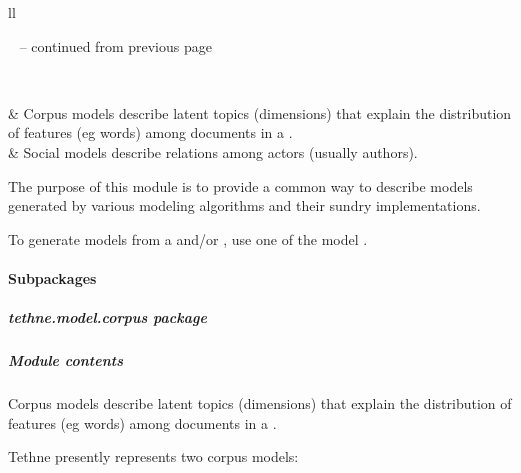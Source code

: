 \documentclass[letterpaper,10pt,english]{sphinxmanual}
\begin{document}
\begin{longtable}{ll}
\hline
\endfirsthead

%
{{\textsf{\tablename\ \thetable{} -- continued from previous page}}} \\
\hline
\endhead

\hline {} \\ \hline
\endfoot

\endlastfoot


{\hyperref[tethne.model.corpus:module-tethne.model.corpus]{}}
 & 
Corpus models describe latent topics (dimensions) that explain the distribution of features (eg words) among documents in a {\hyperref[tethne.classes.corpus:tethne.classes.corpus.Corpus]{}}.
\\

{\hyperref[tethne.model.social:module-tethne.model.social]{}}
 & 
Social models describe relations among actors (usually authors).
\\
\hline\end{longtable}


The purpose of this module is to provide a common way to describe models
generated by various modeling algorithms and their sundry implementations.

To generate models from a {\hyperref[tethne.classes.corpus:tethne.classes.corpus.Corpus]{}} and/or {\hyperref[tethne.classes.graphcollection:tethne.classes.graphcollection.GraphCollection]{}},
use one of the model {\hyperref[tethne.model.managers:module-tethne.model.managers]{}}.


\paragraph{Subpackages}
\label{tethne.model:subpackages}

\subparagraph{tethne.model.corpus package}
\label{tethne.model.corpus::doc}\label{tethne.model.corpus:tethne-model-corpus-package}

\subparagraph{Module contents}
\label{tethne.model.corpus:module-contents}\label{tethne.model.corpus:module-tethne.model.corpus}
Corpus models describe latent topics (dimensions) that explain the
distribution of features (eg words) among documents in a {\hyperref[tethne.classes.corpus:tethne.classes.corpus.Corpus]{}}.

Tethne presently represents two corpus models:
\end{document}
